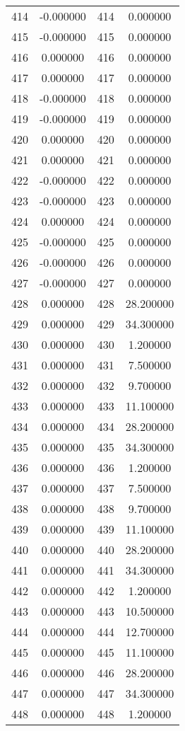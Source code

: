 \documentclass[12pt]{article}
\begin{document}
\begin{longtable}{@{}cccc@{}}
414 & -0.000000 & 414 & 0.000000 \\
415 & -0.000000 & 415 & 0.000000 \\
416 & 0.000000 & 416 & 0.000000 \\
417 & 0.000000 & 417 & 0.000000 \\
418 & -0.000000 & 418 & 0.000000 \\
419 & -0.000000 & 419 & 0.000000 \\
420 & 0.000000 & 420 & 0.000000 \\
421 & 0.000000 & 421 & 0.000000 \\
422 & -0.000000 & 422 & 0.000000 \\
423 & -0.000000 & 423 & 0.000000 \\
424 & 0.000000 & 424 & 0.000000 \\
425 & -0.000000 & 425 & 0.000000 \\
426 & -0.000000 & 426 & 0.000000 \\
427 & -0.000000 & 427 & 0.000000 \\
428 & 0.000000 & 428 & 28.200000 \\
429 & 0.000000 & 429 & 34.300000 \\
430 & 0.000000 & 430 & 1.200000 \\
431 & 0.000000 & 431 & 7.500000 \\
432 & 0.000000 & 432 & 9.700000 \\
433 & 0.000000 & 433 & 11.100000 \\
434 & 0.000000 & 434 & 28.200000 \\
435 & 0.000000 & 435 & 34.300000 \\
436 & 0.000000 & 436 & 1.200000 \\
437 & 0.000000 & 437 & 7.500000 \\
438 & 0.000000 & 438 & 9.700000 \\
439 & 0.000000 & 439 & 11.100000 \\
440 & 0.000000 & 440 & 28.200000 \\
441 & 0.000000 & 441 & 34.300000 \\
442 & 0.000000 & 442 & 1.200000 \\
443 & 0.000000 & 443 & 10.500000 \\
444 & 0.000000 & 444 & 12.700000 \\
445 & 0.000000 & 445 & 11.100000 \\
446 & 0.000000 & 446 & 28.200000 \\
447 & 0.000000 & 447 & 34.300000 \\
448 & 0.000000 & 448 & 1.200000 \\

\end{longtable}
\end{document}
